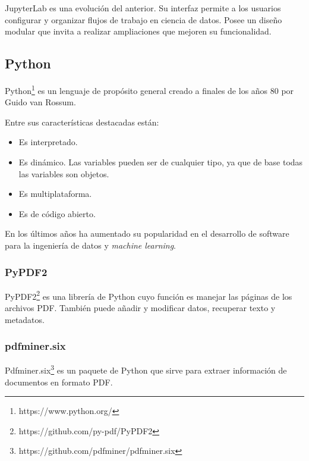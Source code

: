 \documentclass[../main.tex]{subfiles}
\begin{document}
JupyterLab es una evolución del anterior. Su interfaz permite a los usuarios configurar y organizar flujos de trabajo en ciencia de datos. Posee un diseño modular que invita a realizar ampliaciones que mejoren su funcionalidad.

\subsection{Python}

Python\footnote{https://www.python.org/} es un lenguaje de propósito general creado a finales de los años 80 por Guido van Rossum.

Entre sus características destacadas están:

\begin{itemize}
	
	\item Es interpretado.
	
	\item Es dinámico. Las variables pueden ser de cualquier tipo, ya que de base todas las variables son objetos.
	
	\item Es multiplataforma.
	
	\item Es de código abierto.
	
\end{itemize}

En los últimos años ha aumentado su popularidad en el desarrollo de software para la ingeniería de datos y \textit{machine learning}.

\subsubsection{PyPDF2}

PyPDF2\footnote{https://github.com/py-pdf/PyPDF2} es una librería de Python cuyo función es manejar las páginas de los archivos PDF. También puede añadir y modificar datos, recuperar texto y metadatos.

\subsubsection{pdfminer.six}

Pdfminer.six\footnote{https://github.com/pdfminer/pdfminer.six} es un paquete de Python que sirve para extraer información de documentos en formato PDF.
\end{document}
